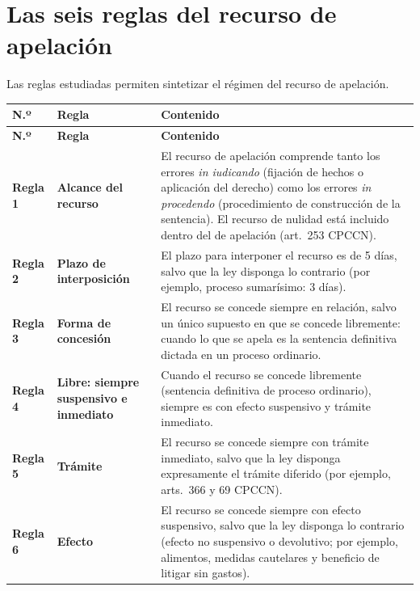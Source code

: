 \documentclass[12pt,oneside]{book}
\begin{document}
\section{Las seis reglas del recurso de apelación}

Las reglas estudiadas permiten sintetizar el r\'egimen del recurso de apelaci\'on.

\begin{longtable}{
    >{\raggedright\arraybackslash}p{}
    >{\raggedright\arraybackslash}p{}
    >{\raggedright\arraybackslash}p{}
}
\toprule
\textbf{N.º} & \textbf{Regla} & \textbf{Contenido} \\
\midrule
\endfirsthead
\toprule
\textbf{N.º} & \textbf{Regla} & \textbf{Contenido} \\
\midrule
\endhead
\bottomrule
\endlastfoot

\textbf{Regla 1} & \textbf{Alcance del recurso} & El recurso de apelaci\'on comprende tanto los errores \textit{in iudicando} (fijaci\'on de hechos o aplicaci\'on del derecho) como los errores \textit{in procedendo} (procedimiento de construcci\'on de la sentencia). El recurso de nulidad est\'a incluido dentro del de apelaci\'on (art.~253 CPCCN). \\
\addlinespace
\textbf{Regla 2} & \textbf{Plazo de interposici\'on} & El plazo para interponer el recurso es de 5 d\'ias, salvo que la ley disponga lo contrario (por ejemplo, proceso sumar\'isimo: 3 d\'ias). \\
\addlinespace
\textbf{Regla 3} & \textbf{Forma de concesi\'on} & El recurso se concede siempre en relaci\'on, salvo un \'unico supuesto en que se concede libremente: cuando lo que se apela es la sentencia definitiva dictada en un proceso ordinario. \\
\addlinespace
\textbf{Regla 4} & \textbf{Libre: siempre suspensivo e inmediato} & Cuando el recurso se concede libremente (sentencia definitiva de proceso ordinario), siempre es con efecto suspensivo y tr\'amite inmediato. \\
\addlinespace
\textbf{Regla 5} & \textbf{Tr\'amite} & El recurso se concede siempre con tr\'amite inmediato, salvo que la ley disponga expresamente el tr\'amite diferido (por ejemplo, arts.~366 y 69 CPCCN). \\
\addlinespace
\textbf{Regla 6} & \textbf{Efecto} & El recurso se concede siempre con efecto suspensivo, salvo que la ley disponga lo contrario (efecto no suspensivo o devolutivo; por ejemplo, alimentos, medidas cautelares y beneficio de litigar sin gastos). \\
\end{longtable}
\end{document}
